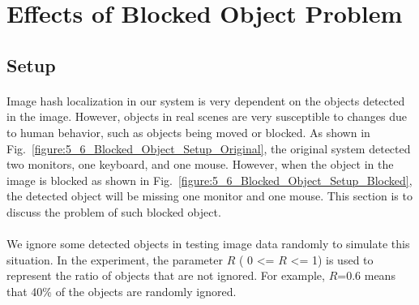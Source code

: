 \documentclass[a4paper,12pt]{report}
\begin{document}
\section{Effects of Blocked Object Problem}
\subsection{Setup}

\paragraph{}
Image hash localization in our system is very dependent on the objects detected in the image. However, objects in real scenes are very susceptible to changes due to human behavior, such as objects being moved or blocked. As shown in Fig.~\ref{figure:5_6_Blocked_Object_Setup_Original}, the original system detected two monitors, one keyboard, and one mouse. However, when the object in the image is blocked as shown in Fig.~\ref{figure:5_6_Blocked_Object_Setup_Blocked}, the detected object will be missing one monitor and one mouse. This section is to discuss the problem of such blocked object.

\paragraph{}
We ignore some detected objects in testing image data randomly to simulate this situation. In the experiment, the parameter $R$ ( 0 <= $R$ <= 1) is used to represent the ratio of objects that are not ignored. For example, $R$=0.6 means that 40\% of the objects are randomly ignored.
\end{document}
